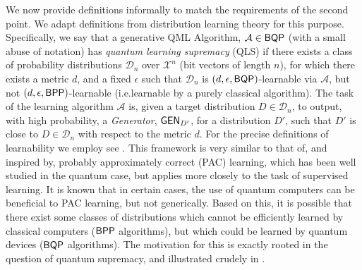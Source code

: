 We now provide definitions informally to match the requirements of the second point. We adapt definitions from distribution learning theory\cite{kearns_learnability_1994} for this purpose. Specifically, we say that a generative QML Algorithm, $\mathcal{A}\in \textsf{BQP}$ (with a small abuse of notation) has %
\textit{quantum learning supremacy} (QLS) if there exists a class of probability distributions 
$\mathcal{D}_n$ over $\mathcal X^n$ (bit vectors of length $n$), 
for which there exists a metric $d$, and a fixed $\epsilon$ such that 
$\mathcal{D}_n$ is $(d ,\epsilon, \textsf{BQP})$-learnable via $\mathcal{A}$, 
but not $\left( d ,\epsilon, \textsf{BPP} \right)$-learnable (i.e.\@ learnable by a purely classical algorithm). The task of the learning algorithm $\mathcal{A}$ is, given a target distribution $D\in \mathcal D_n$,
to output, with high probability, a \textit{Generator}, 
$\operatorname{\textsf{GEN}}_{D'}$, for a distribution $D'$, 
such that $D'$ is close to $D \in \mathcal{D}_n$ with respect to the metric $d$. 
For the precise definitions of learnability we employ see .
This framework is very similar to that of, and inspired by, probably approximately correct (PAC) learning, which has been well studied in the quantum case\cite{arunachalam_survey_2017}, but applies more closely to the task of supervised learning. It is known that in certain cases, the use of quantum computers can be beneficial to PAC learning, but not generically\cite{arunachalam_quantum_2019}. Based on this, it is possible that there exist some classes of distributions which cannot be efficiently learned by classical computers ($\textsf{BPP}$ algorithms), but which could be learned by quantum devices ($\textsf{BQP}$ algorithms). The motivation for this is exactly rooted in the question of quantum supremacy, and illustrated crudely in . 

